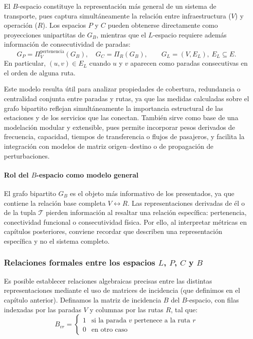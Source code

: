                 El $B$-espacio constituye la representación más general de un sistema de transporte, pues captura simultáneamente la relación entre infraestructura ($V$) y operación ($R$). Los espacios $P$ y $C$ pueden obtenerse directamente como proyecciones unipartitas de $G_B$, mientras que el $L$-espacio requiere además información de consecutividad de paradas:
                $$
                    G_P = \Pi_V^{\text{pertenencia}}(G_B), \quad
                    G_C = \Pi_R(G_B),
                    \qquad
                    G_L=(V,E_L),\ E_L\subseteq E.
                $$
                En particular, $(u,v)\in E_L$ cuando $u$ y $v$ aparecen como paradas consecutivas en el orden de alguna ruta.

                Este modelo resulta útil para analizar propiedades de cobertura, redundancia o centralidad conjunta entre paradas y rutas, ya que las medidas calculadas sobre el grafo bipartito reflejan simultáneamente la importancia estructural de las estaciones y de los servicios que las conectan. También sirve como base de una modelación modular y extensible, pues permite incorporar pesos derivados de frecuencia, capacidad, tiempos de transferencia o flujos de pasajeros, y facilita la integración con modelos de matriz origen--destino o de propagación de perturbaciones.

                \paragraph{Rol del $B$-espacio como modelo general}
                El grafo bipartito $G_B$ es el objeto más informativo de los presentados, ya que contiene la relación base completa $V \leftrightarrow R$. Las representaciones derivadas de él o de la tupla $\mathcal{T}$ pierden información al resaltar una relación específica: pertenencia, conectividad funcional o consecutividad física. Por ello, al interpretar métricas en capítulos posteriores, conviene recordar que describen una representación específica y no el sistema completo.

            \subsubsection{Relaciones formales entre los espacios $L$, $P$, $C$ y $B$}

	    Es posible establecer relaciones algebraicas precisas entre las distintas representaciones mediante el uso de matrices de incidencia (que definimos en el capítulo anterior). Definamos la matriz de incidencia $B$ del $B$-espacio, con filas indexadas por las paradas $V$ y columnas por las rutas $R$, tal que:
            \[
            B_{vr} = \begin{cases} 1 & \text{si la parada } v \text{ pertenece a la ruta } r \\ 0 & \text{en otro caso} \end{cases}
            \]

